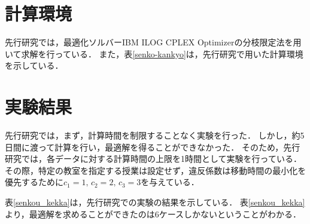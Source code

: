 \documentclass[12pt, a4paper, fleqn]{jreport}
\begin{document}
\section{計算環境}
先行研究では，最適化ソルバーIBM ILOG CPLEX Optimizerの分枝限定法を用いて求解を行っている．
また，表\ref{senko-kankyo}は，先行研究で用いた計算環境を示している．
\vspace{-7.0mm}
\begin{table}[H]
\begin{center}
\caption{先行研究での計算環境}
\label{senko-kankyo}
\end{center}
\end{table}


\section{実験結果}
先行研究では，まず，計算時間を制限することなく実験を行った．
しかし，約5日間に渡って計算を行い，最適解を得ることができなかった．
そのため，先行研究では，各データに対する計算時間の上限を1時間として実験を行っている．
その際，特定の教室を指定する授業は設定せず，違反係数は移動時間の最小化を優先するために$c_1=1,\, c_2=2,\, c_3=3$を与えている．

表\ref{senkou_kekka}は，先行研究での実験の結果を示している．
表\ref{senkou_kekka}より，最適解を求めることができたのは6ケースしかないということがわかる．
\end{document}
